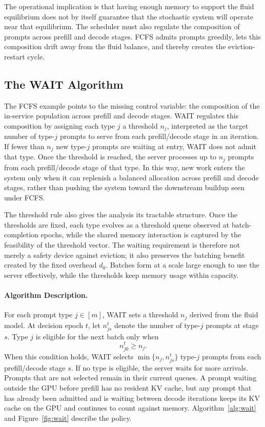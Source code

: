 The operational implication is that having enough memory to support the fluid equilibrium does not by itself guarantee that the stochastic system will operate near that equilibrium. The scheduler must also regulate the composition of prompts across prefill and decode stages. FCFS admits prompts greedily, lets this composition drift away from the fluid balance, and thereby creates the eviction-restart cycle.

\subsection{The WAIT Algorithm}
\label{subsec:wait_algorithm}

The FCFS example points to the missing control variable: the composition of the in-service population across prefill and decode stages. WAIT regulates this composition by assigning each type \(j\) a threshold \(n_j\), interpreted as the target number of type-\(j\) prompts to serve from each prefill/decode stage in an iteration. If fewer than \(n_j\) new type-\(j\) prompts are waiting at entry, WAIT does not admit that type. Once the threshold is reached, the server processes up to \(n_j\) prompts from each prefill/decode stage of that type. In this way, new work enters the system only when it can replenish a balanced allocation across prefill and decode stages, rather than pushing the system toward the downstream buildup seen under FCFS.

The threshold rule also gives the analysis its tractable structure. Once the thresholds are fixed, each type evolves as a threshold queue observed at batch-completion epochs, while the shared memory interaction is captured by the feasibility of the threshold vector. The waiting requirement is therefore not merely a safety device against eviction; it also preserves the batching benefit created by the fixed overhead \(d_0\). Batches form at a scale large enough to use the server effectively, while the thresholds keep memory usage within capacity.

\paragraph{Algorithm Description.} For each prompt type \(j \in [m]\), WAIT sets a threshold \(n_j\) derived from the fluid model. At decision epoch \(t\), let \(n_{js}^t\) denote the number of type-\(j\) prompts at stage \(s\). Type \(j\) is eligible for the next batch only when
\[
n_{j0}^t \geq n_j.
\]
When this condition holds, WAIT selects \(\min\{n_j,n_{js}^t\}\) type-\(j\) prompts from each prefill/decode stage \(s\). If no type is eligible, the server waits for more arrivals. Prompts that are not selected remain in their current queues. A prompt waiting outside the GPU before prefill has no resident KV cache, but any prompt that has already been admitted and is waiting between decode iterations keeps its KV cache on the GPU and continues to count against memory. Algorithm~\ref{alg:wait} and Figure~\ref{fig:wait} describe the policy.

